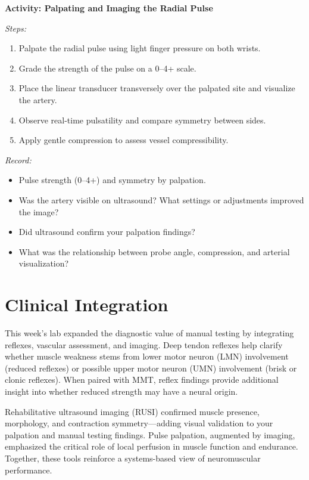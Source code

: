 \begin{labactivitybox}
\textbf{Activity: Palpating and Imaging the Radial Pulse}

\textit{Steps:}
\begin{enumerate}
  \item Palpate the radial pulse using light finger pressure on both wrists.
  \item Grade the strength of the pulse on a 0–4+ scale.
  \item Place the linear transducer transversely over the palpated site and visualize the artery.
  \item Observe real-time pulsatility and compare symmetry between sides.
  \item Apply gentle compression to assess vessel compressibility.
\end{enumerate}

\textit{Record:}
\begin{itemize}
  \item Pulse strength (0–4+) and symmetry by palpation.
  \item Was the artery visible on ultrasound? What settings or adjustments improved the image?
  \item Did ultrasound confirm your palpation findings?
  \item What was the relationship between probe angle, compression, and arterial visualization?
\end{itemize}
\end{labactivitybox}

\section*{Clinical Integration}

This week’s lab expanded the diagnostic value of manual testing by integrating reflexes, vascular assessment, and imaging. Deep tendon reflexes help clarify whether muscle weakness stems from lower motor neuron (LMN) involvement (reduced reflexes) or possible upper motor neuron (UMN) involvement (brisk or clonic reflexes). When paired with MMT, reflex findings provide additional insight into whether reduced strength may have a neural origin.

Rehabilitative ultrasound imaging (RUSI) confirmed muscle presence, morphology, and contraction symmetry—adding visual validation to your palpation and manual testing findings. Pulse palpation, augmented by imaging, emphasized the critical role of local perfusion in muscle function and endurance. Together, these tools reinforce a systems-based view of neuromuscular performance.

